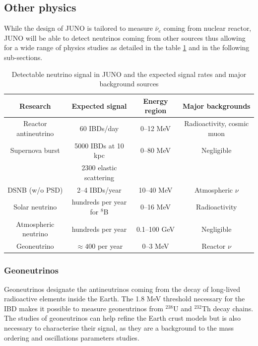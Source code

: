 \documentclass[../main.tex]{subfiles}
\begin{document}
\subsection{Other physics}

While the design of JUNO is tailored to measure $\bar{\nu}_e$ coming from nuclear reactor, JUNO will be able to detect neutrinos coming from other sources thus allowing for a wide range of physics studies as detailed in the table \ref{tab:juno:signal} and in the following sub-sections.

\begin{table}[ht]
\begin{center}
  \begin{tabular}{|c|c|c|c|}
    \hline Research & Expected signal & Energy region & Major backgrounds \\
    \hline Reactor antineutrino & 60 IBDs/day & 0–12 MeV  & Radioactivity, cosmic muon \\
    Supernova burst & 5000 IBDs at 10 kpc & 0–80 MeV & Negligible \\
                    & 2300 elastic scattering  & &  \\
    DSNB (w/o PSD) & 2–4 IBDs/year & 10–40 MeV & Atmospheric $\nu$ \\
    Solar neutrino & hundreds per year for $^8$B & 0–16 MeV & Radioactivity \\
    Atmospheric neutrino & hundreds per year & 0.1–100 GeV  & Negligible \\
    Geoneutrino &  $\approx 400$ per year & 0–3 MeV & Reactor $\nu$ \\
    \hline
  \end{tabular}
  \caption{Detectable neutrino signal in JUNO and the expected signal rates and major background sources}
  \label{tab:juno:signal}
\end{center}
\end{table}


\subsubsection{Geoneutrinos}

Geoneutrinos designate the antineutrinos coming from the decay of long-lived radioactive elements inside the Earth. The 1.8 MeV threshold necessary for the IBD makes it possible to measure geoneutrinos from $^{238}$U and $^{232}$Th decay chains. The studies of geoneutrinos can help refine the Earth crust models but is also necessary to characterise their signal, as they are a background to the mass ordering and oscillations parameters studies.
\end{document}
